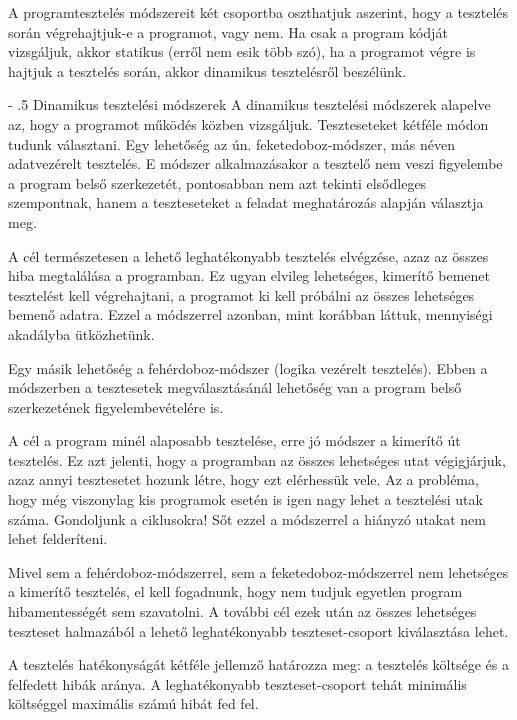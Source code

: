 \documentclass[margin=0px]{article}
\makeatletter
\renewcommand\paragraph{%
	\@startsection{paragraph}{4}{0mm}%
	{-\baselineskip}%
	{.5\baselineskip}%
	{\normalfont\normalsize\bfseries}}
\makeatother
\begin{document}
	A programtesztelés módszereit két csoportba oszthatjuk aszerint, hogy a tesztelés során végrehajtjuk-e a programot, vagy nem. Ha csak a program kódját vizsgáljuk, akkor statikus (erről nem esik több szó), ha a programot végre is hajtjuk a tesztelés során, akkor dinamikus tesztelésről beszélünk.
	
	\paragraph{Dinamikus tesztelési módszerek}
	 A dinamikus tesztelési módszerek alapelve az, hogy a programot működés közben vizsgáljuk. Teszteseteket kétféle módon tudunk választani. Egy lehetőség az ún. feketedoboz-módszer, más néven adatvezérelt tesztelés. E módszer alkalmazásakor a tesztelő nem veszi figyelembe a program belső szerkezetét, pontosabban nem azt tekinti elsődleges szempontnak, hanem a teszteseteket a feladat meghatározás alapján választja meg.
	 
	 A cél természetesen a lehető leghatékonyabb tesztelés elvégzése, azaz az összes hiba megtalálása a programban. Ez ugyan elvileg lehetséges, kimerítő bemenet tesztelést kell végrehajtani, a programot ki kell próbálni az összes lehetséges bemenő adatra. Ezzel a módszerrel azonban, mint korábban láttuk, mennyiségi akadályba ütközhetünk.
	 
	 Egy másik lehetőség a fehérdoboz-módszer (logika vezérelt tesztelés). Ebben a módszerben a tesztesetek megválasztásánál lehetőség van a program belső szerkezetének figyelembevételére is.
	 
	 A cél a program minél alaposabb tesztelése, erre jó módszer a kimerítő út tesztelés. Ez azt jelenti, hogy a programban az összes lehetséges utat végigjárjuk, azaz annyi tesztesetet hozunk létre, hogy ezt elérhessük vele. Az a probléma, hogy még viszonylag kis programok esetén is igen nagy lehet a tesztelési utak száma. Gondoljunk a ciklusokra! Sőt ezzel a módszerrel a hiányzó utakat nem lehet felderíteni.
	 
	 Mivel sem a fehérdoboz-módszerrel, sem a feketedoboz-módszerrel nem lehetséges a kimerítő tesztelés, el kell fogadnunk, hogy nem tudjuk egyetlen program hibamentességét sem szavatolni. A további cél ezek után az összes lehetséges teszteset halmazából a lehető leghatékonyabb teszteset-csoport kiválasztása lehet.
	 
	 A tesztelés hatékonyságát kétféle jellemző határozza meg: a tesztelés költsége és a felfedett hibák aránya. A leghatékonyabb teszteset-csoport tehát minimális költséggel maximális számú hibát fed fel.
	 
\end{document}
